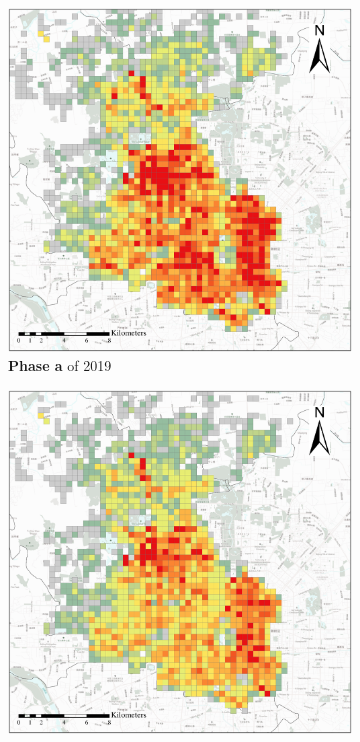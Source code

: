 \documentclass[preprints,article,accept,moreauthors,pdftex]{Definitions/mdpi}
\begin{document}
\begin{figure}[ht]
    \vspace{6pt}
    \begin{subfigure}{.28\textwidth}
        \includegraphics[width=\textwidth]{Figures/BSSPhase1_2019.eps}
        \caption{\textbf{Phase a} of 2019}\label{fig:p_a_2019}
    \end{subfigure}
    \begin{subfigure}{.28\textwidth}
        \includegraphics[width=\textwidth]{Figures/BSSPhase2_2019.eps}

\end{subfigure}
\end{figure}
\end{document}
